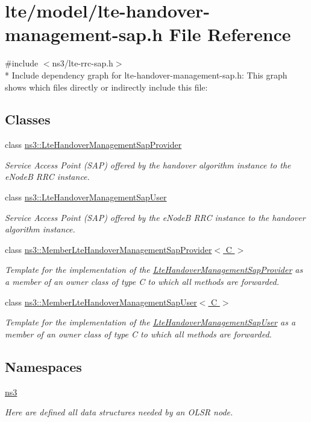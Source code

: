 \hypertarget{lte-handover-management-sap_8h}{}\section{lte/model/lte-\/handover-\/management-\/sap.h File Reference}
\label{lte-handover-management-sap_8h}
{\ttfamily \#include $<$ns3/lte-\/rrc-\/sap.\+h$>$}\\*
Include dependency graph for lte-\/handover-\/management-\/sap.h\+:
This graph shows which files directly or indirectly include this file\+:
\subsection*{Classes}
\begin{DoxyCompactItemize}
\item 
class \hyperlink{classns3_1_1LteHandoverManagementSapProvider}{ns3\+::\+Lte\+Handover\+Management\+Sap\+Provider}
\begin{DoxyCompactList}\small\item\em Service Access Point (S\+AP) offered by the handover algorithm instance to the e\+NodeB R\+RC instance. \end{DoxyCompactList}\item 
class \hyperlink{classns3_1_1LteHandoverManagementSapUser}{ns3\+::\+Lte\+Handover\+Management\+Sap\+User}
\begin{DoxyCompactList}\small\item\em Service Access Point (S\+AP) offered by the e\+NodeB R\+RC instance to the handover algorithm instance. \end{DoxyCompactList}\item 
class \hyperlink{classns3_1_1MemberLteHandoverManagementSapProvider}{ns3\+::\+Member\+Lte\+Handover\+Management\+Sap\+Provider$<$ C $>$}
\begin{DoxyCompactList}\small\item\em Template for the implementation of the \hyperlink{classns3_1_1LteHandoverManagementSapProvider}{Lte\+Handover\+Management\+Sap\+Provider} as a member of an owner class of type C to which all methods are forwarded. \end{DoxyCompactList}\item 
class \hyperlink{classns3_1_1MemberLteHandoverManagementSapUser}{ns3\+::\+Member\+Lte\+Handover\+Management\+Sap\+User$<$ C $>$}
\begin{DoxyCompactList}\small\item\em Template for the implementation of the \hyperlink{classns3_1_1LteHandoverManagementSapUser}{Lte\+Handover\+Management\+Sap\+User} as a member of an owner class of type C to which all methods are forwarded. \end{DoxyCompactList}\end{DoxyCompactItemize}
\subsection*{Namespaces}
\begin{DoxyCompactItemize}
\item 
 \hyperlink{namespacens3}{ns3}
\begin{DoxyCompactList}\small\item\em Here are defined all data structures needed by an O\+L\+SR node. \end{DoxyCompactList}\end{DoxyCompactItemize}
